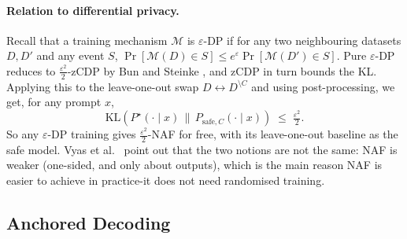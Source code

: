 \documentclass{article}
\begin{document}
\paragraph{Relation to differential privacy.}
Recall that a training mechanism $\mathcal{M}$ is $\varepsilon$-DP if for any two neighbouring datasets $D,D'$ and any event $S$, $\Pr[\mathcal{M}(D)\in S]\le e^{\varepsilon}\Pr[\mathcal{M}(D')\in S]$. Pure $\varepsilon$-DP reduces to $\tfrac{\varepsilon^2}{2}$-zCDP by Bun and Steinke \cite{bunsteinke2016cdp}, and zCDP in turn bounds the KL. Applying this to the leave-one-out swap $D\leftrightarrow D^{\setminus C}$ and using post-processing, we get, for any prompt $x$,
\begin{equation}
\label{eq:dp-implies-naf}
  \mathrm{KL}(P^\star(\cdot\mid x)\,\|\,P_{\mathrm{safe},C}(\cdot\mid x)) \;\le\; \tfrac{\varepsilon^2}{2}.
\end{equation}
So any $\varepsilon$-DP training gives $\tfrac{\varepsilon^2}{2}$-NAF for free, with its leave-one-out baseline as the safe model. Vyas et al.\ \cite{vyas2023naf} point out that the two notions are not the same: NAF is weaker (one-sided, and only about outputs), which is the main reason NAF is easier to achieve in practice-it does not need randomised training.

\subsection{Anchored Decoding}
\end{document}
